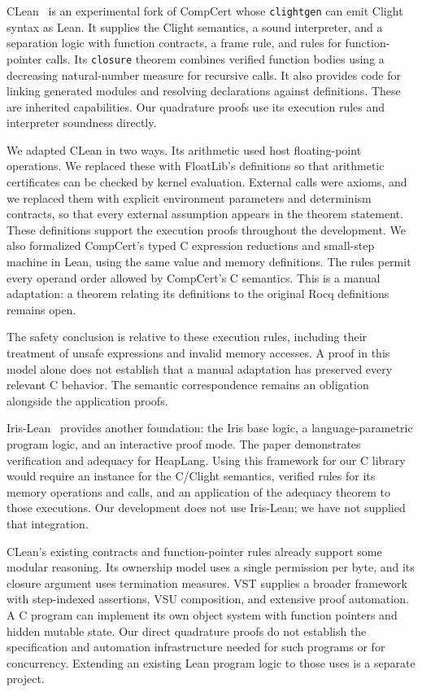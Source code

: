 \documentclass[11pt]{article}
\newcommand{\code}[1]{%
  \ifmmode\text{\texttt{\detokenize{#1}}}\else\nolinkurl{#1}\fi}
\begin{document}
CLean~\cite{clean} is an experimental fork of CompCert
whose \code{clightgen} can emit Clight syntax as Lean. It supplies the
Clight semantics, a sound interpreter, and a separation logic with function
contracts, a frame rule, and rules for function-pointer calls. Its
\code{closure} theorem combines verified function bodies using a decreasing
natural-number measure for recursive calls. It also provides code for
linking generated modules and resolving declarations against definitions.
These are inherited capabilities. Our quadrature proofs use its execution
rules and interpreter soundness directly.

We adapted CLean in two ways. Its arithmetic used host floating-point
operations. We replaced these with
FloatLib's definitions so that arithmetic certificates can be checked by
kernel evaluation. External calls were axioms, and
we replaced them with explicit environment parameters and determinism
contracts, so that every external assumption appears in the theorem
statement. These definitions support the execution proofs throughout the
development. We also
formalized CompCert's typed C expression reductions and small-step machine
in Lean, using the same value and memory definitions. The rules permit
every operand order allowed by CompCert's C semantics. This is a manual
adaptation: a theorem relating its definitions to the original Rocq
definitions remains open.

The safety conclusion is relative to these execution rules, including
their treatment of unsafe expressions and invalid memory accesses. A proof
in this model alone does not establish that a manual adaptation has
preserved every relevant C behavior. The semantic correspondence remains
an obligation alongside the application proofs.

Iris-Lean~\cite{irislean} provides another foundation: the Iris base logic, a
language-parametric program logic, and an interactive proof mode. The
paper demonstrates verification and adequacy for HeapLang. Using this
framework for our C library would require an instance for the C/Clight
semantics, verified rules for its memory operations and calls, and an
application of the adequacy theorem to those executions. Our development
does not use Iris-Lean; we have not supplied that integration.

CLean's existing contracts and function-pointer rules already support
some modular reasoning. Its ownership model uses a single permission per
byte, and its closure argument uses termination measures. VST supplies a
broader framework with step-indexed assertions, VSU composition, and
extensive proof automation. A C program can implement its own object system
with function pointers and hidden mutable state. Our direct quadrature
proofs do not establish the specification and automation infrastructure
needed for such programs or for concurrency. Extending an existing Lean
program logic to those uses is a separate project.
\end{document}
